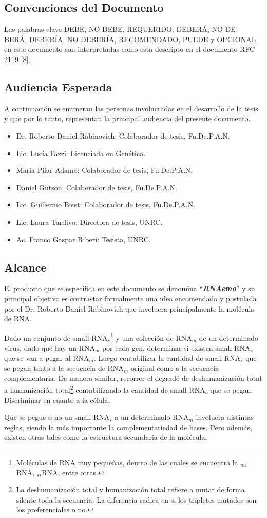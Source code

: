 \documentclass[12pt,a4paper,english,spanish]{article}
\newcommand{\rnaemo}{\textbf{\emph{RNAemo}}}
\begin{document}
\subsection{Convenciones del Documento}
Las palabras clave DEBE, NO DEBE, REQUERIDO, DEBERÁ, NO DE-
BERÁ, DEBERÍA, NO DEBERÍA, RECOMENDADO, PUEDE y OPCIONAL
en este documento son interpretadas como esta descripto en el documento RFC
2119 [8]. 

\subsection{Audiencia Esperada}
\par A continuación se enumeran las personas involucradas en el desarrollo de la
tesis y que por lo tanto, representan la principal audiencia del presente documento.
\begin{itemize}
	\item Dr. Roberto Daniel Rabinovich: Colaborador de tesis, Fu.De.P.A.N.
	\item Lic. Lucía Fazzi: Licenciada en Genética.
	\item Maria Pilar Adamo: Colaborador de tesis, Fu.De.P.A.N. 
	\item Daniel Gutson: Colaborador de tesis, Fu.De.P.A.N. 
	\item Lic. Guillermo Biset: Colaborador de tesis, Fu.De.P.A.N. 
	\item Lic. Laura Tardivo: Directora de tesis, UNRC. 
	\item Ac. Franco Gaspar Riberi: Tesista, UNRC.
\end{itemize}

\subsection{Alcance}
\par El producto que se especifica en este documento se denomina ``\rnaemo''
 y su principal objetivo es contrastar formalmente una idea encomendada y
postulada por el Dr. Roberto Daniel Rabinovich que involucra principalmente 
la molécula de RNA. 
\par Dado un conjunto de small-RNA$_s$\footnote{Moléculas de RNA muy pequeñas, 
dentro de las cuales se encuentra la $_m$$_i$RNA, $_s$$_i$RNA, entre otras.} y
 una colección de RNA$_m$ de un determinado virus, dado que hay un RNA$_m$ por
 cada gen, determinar si existen small-RNA$_s$ que se van a pegar al RNA$_m$. 
Luego contabilizar la cantidad de small-RNA$_s$ que se pegan tanto a la secuencia
 de RNA$_m$ original como a la secuencia complementaria. De manera similar, recorrer 
el degradé de deshumanización total a humanización total\footnote{La deshumanización total
 y humanización total refiere a mutar de forma silente toda la secuencia. La diferencia radica
 en si los tripletes mutados son los preferenciales o no.} contabilizando la cantidad 
de small-RNA$_s$ que se pegan. Discriminar en cuanto a la célula.
\par Que se pegue o no un small-RNA$_s$ a un determinado RNA$_m$ involucra distintas
 reglas, siendo la más importante la complementariedad de bases. Pero además, existen 
otras tales como la estructura secundaria de la molécula.
\end{document}

